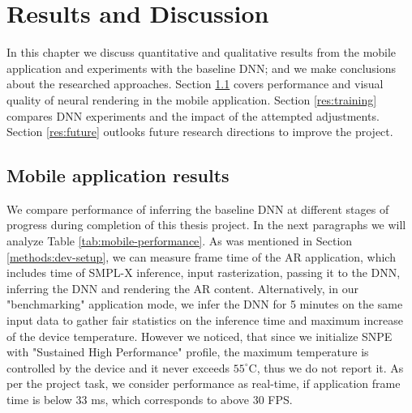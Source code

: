 \chapter{Results and Discussion}\label{chapter:res}
In this chapter we discuss quantitative and qualitative results from the mobile application and experiments with the baseline DNN; and we make conclusions about the researched approaches. Section \ref{res:performance} covers performance and visual quality of neural rendering in the mobile application. Section \ref{res:training} compares DNN experiments and the impact of the attempted adjustments. Section \ref{res:future} outlooks future research directions to improve the project.

\section{Mobile application results}\label{res:performance}

We compare performance of inferring the baseline DNN at different stages of progress during completion of this thesis project. In the next paragraphs we will analyze Table \ref{tab:mobile-performance}. As was mentioned in Section \ref{methods:dev-setup}, we can measure frame time of the AR application, which includes time of SMPL-X inference, input rasterization, passing it to the DNN, inferring the DNN and rendering the AR content. Alternatively, in our "benchmarking" application mode, we infer the DNN for 5 minutes on the same input data to gather fair statistics on the inference time and maximum increase of the device temperature. However we noticed, that since we initialize SNPE with "Sustained High Performance" profile, the maximum temperature is controlled by the device and it never exceeds $55^\circ$C, thus we do not report it. As per the project task, we consider performance as real-time, if application frame time is below 33 ms, which corresponds to above 30 FPS.

